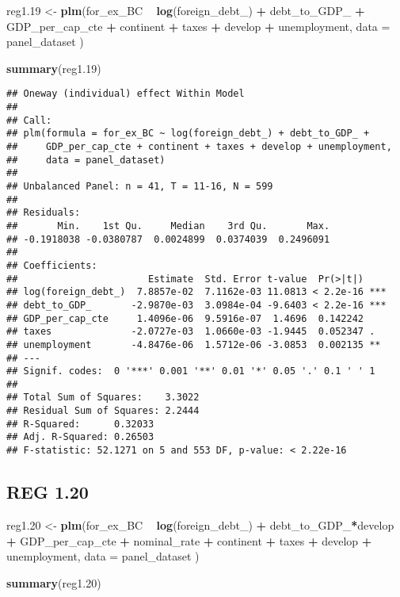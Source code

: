 \documentclass[]{article}
\newenvironment{Shaded}{\begin{snugshade}}{\end{snugshade}}
\newcommand{\KeywordTok}[1]{\textcolor[rgb]{0.13,0.29,0.53}{\textbf{#1}}}
\newcommand{\DataTypeTok}[1]{\textcolor[rgb]{0.13,0.29,0.53}{#1}}
\newcommand{\DecValTok}[1]{\textcolor[rgb]{0.00,0.00,0.81}{#1}}
\newcommand{\StringTok}[1]{\textcolor[rgb]{0.31,0.60,0.02}{#1}}
\newcommand{\OperatorTok}[1]{\textcolor[rgb]{0.81,0.36,0.00}{\textbf{#1}}}
\newcommand{\NormalTok}[1]{#1}
\begin{document}
\begin{Shaded}
\begin{Highlighting}[]
\NormalTok{reg1.}\DecValTok{19}\NormalTok{ <-}\StringTok{ }\KeywordTok{plm}\NormalTok{(for_ex_BC }\OperatorTok{~}\StringTok{ }\KeywordTok{log}\NormalTok{(foreign_debt_) }\OperatorTok{+}\StringTok{ }\NormalTok{debt_to_GDP_ }\OperatorTok{+}\StringTok{ }\NormalTok{GDP_per_cap_cte }\OperatorTok{+}\StringTok{ }\NormalTok{continent }\OperatorTok{+}\StringTok{ }\NormalTok{taxes }\OperatorTok{+}\StringTok{ }\NormalTok{develop }\OperatorTok{+}\StringTok{ }\NormalTok{unemployment, }\DataTypeTok{data =}\NormalTok{ panel_dataset )}

\KeywordTok{summary}\NormalTok{(reg1.}\DecValTok{19}\NormalTok{)}
\end{Highlighting}
\end{Shaded}

\begin{verbatim}
## Oneway (individual) effect Within Model
## 
## Call:
## plm(formula = for_ex_BC ~ log(foreign_debt_) + debt_to_GDP_ + 
##     GDP_per_cap_cte + continent + taxes + develop + unemployment, 
##     data = panel_dataset)
## 
## Unbalanced Panel: n = 41, T = 11-16, N = 599
## 
## Residuals:
##       Min.    1st Qu.     Median    3rd Qu.       Max. 
## -0.1918038 -0.0380787  0.0024899  0.0374039  0.2496091 
## 
## Coefficients:
##                       Estimate  Std. Error t-value  Pr(>|t|)    
## log(foreign_debt_)  7.8857e-02  7.1162e-03 11.0813 < 2.2e-16 ***
## debt_to_GDP_       -2.9870e-03  3.0984e-04 -9.6403 < 2.2e-16 ***
## GDP_per_cap_cte     1.4096e-06  9.5916e-07  1.4696  0.142242    
## taxes              -2.0727e-03  1.0660e-03 -1.9445  0.052347 .  
## unemployment       -4.8476e-06  1.5712e-06 -3.0853  0.002135 ** 
## ---
## Signif. codes:  0 '***' 0.001 '**' 0.01 '*' 0.05 '.' 0.1 ' ' 1
## 
## Total Sum of Squares:    3.3022
## Residual Sum of Squares: 2.2444
## R-Squared:      0.32033
## Adj. R-Squared: 0.26503
## F-statistic: 52.1271 on 5 and 553 DF, p-value: < 2.22e-16
\end{verbatim}

\subsection{REG 1.20}\label{reg-1.20}

\begin{Shaded}
\begin{Highlighting}[]
\NormalTok{reg1.}\DecValTok{20}\NormalTok{ <-}\StringTok{ }\KeywordTok{plm}\NormalTok{(for_ex_BC }\OperatorTok{~}\StringTok{  }\KeywordTok{log}\NormalTok{(foreign_debt_) }\OperatorTok{+}\StringTok{ }\NormalTok{debt_to_GDP_}\OperatorTok{*}\NormalTok{develop }\OperatorTok{+}\StringTok{ }\NormalTok{GDP_per_cap_cte }\OperatorTok{+}\StringTok{ }\NormalTok{nominal_rate }\OperatorTok{+}\StringTok{ }\NormalTok{continent }\OperatorTok{+}\StringTok{ }\NormalTok{taxes }\OperatorTok{+}\StringTok{ }\NormalTok{develop }\OperatorTok{+}\StringTok{ }\NormalTok{unemployment, }\DataTypeTok{data =}\NormalTok{ panel_dataset )}

\KeywordTok{summary}\NormalTok{(reg1.}\DecValTok{20}\NormalTok{)}
\end{Highlighting}
\end{Shaded}
\end{document}
